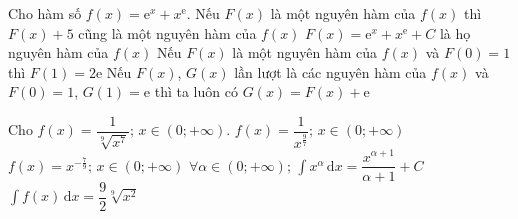 \begin{ex}%
	Cho hàm số $f(x)=\mathrm{e}^x+x^\mathrm{e}$. 
	 \choiceTF
		{\True Nếu $F(x)$ là một nguyên hàm  của $f(x)$ thì $F(x)+5$ cũng là một nguyên hàm của $f(x)$}
		{$F(x)=\mathrm{e}^x+x^\mathrm{e}+C$ là họ nguyên  hàm của $f(x)$}
		{\True Nếu $F(x)$ là một  nguyên hàm của $f(x)$ và $F(0)=1$ thì $F(1)=2\mathrm{e}$}
		{Nếu $F(x)$, $G(x)$ lần  lượt là các nguyên hàm của $f(x)$ và $F(0)=1$, $G(1)=\mathrm{e}$ thì ta luôn có $G(x)=F(x)+\mathrm{e}$}
\end{ex}

\begin{ex}%
	Cho  $f(x)=\dfrac{1}{\sqrt[9]{x^7}};\,x\in (0;+\infty)$.
	\choiceTF 
		{$f(x)=\dfrac{1}{x^{\tfrac{9}{7}}};\,x\in (0;+\infty)$} 
		{\True  $f(x)={{x}^{-\tfrac{7}{9}}};\,x\in (0;+\infty)$}
		{\True $\forall \alpha \in (0;+\infty);\,\displaystyle\int{x^{\alpha }} \mathrm{\,d}x=\dfrac{x^{\alpha  +1}}{\alpha +1}+C$}
		 {$\displaystyle\int{f(x)}\mathrm{\,d}x=\dfrac{9}{2}\sqrt[9]{x^2}$}
\end{ex}


